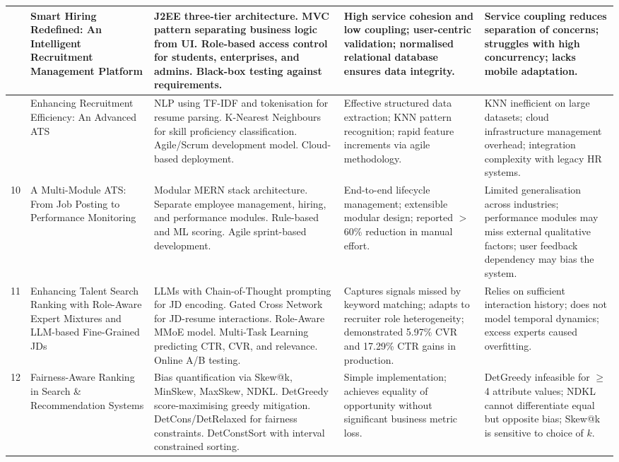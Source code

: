 \documentclass[12pt,a4paper]{report}
\begin{document}
\begin{longtable}{|>{\centering\arraybackslash}p{0.6cm}|p{3.1cm}|p{3.6cm}|p{3.2cm}|p{3.2cm}|}
8 & Smart Hiring Redefined: An Intelligent Recruitment Management Platform \cite{ref8} &
J2EE three-tier architecture. MVC pattern separating business logic from UI. Role-based access control for students, enterprises, and admins. Black-box testing against requirements. &
High service cohesion and low coupling; user-centric validation; normalised relational database ensures data integrity. &
Service coupling reduces separation of concerns; struggles with high concurrency; lacks mobile adaptation. \\
\hline

9 & Enhancing Recruitment Efficiency: An Advanced ATS \cite{ref9} &
NLP using TF-IDF and tokenisation for resume parsing. K-Nearest Neighbours for skill proficiency classification. Agile/Scrum development model. Cloud-based deployment. &
Effective structured data extraction; KNN pattern recognition; rapid feature increments via agile methodology. &
KNN inefficient on large datasets; cloud infrastructure management overhead; integration complexity with legacy HR systems. \\
\hline

10 & A Multi-Module ATS: From Job Posting to Performance Monitoring \cite{ref10} &
Modular MERN stack architecture. Separate employee management, hiring, and performance modules. Rule-based and ML scoring. Agile sprint-based development. &
End-to-end lifecycle management; extensible modular design; reported $>$60\% reduction in manual effort. &
Limited generalisation across industries; performance modules may miss external qualitative factors; user feedback dependency may bias the system. \\
\hline

11 & Enhancing Talent Search Ranking with Role-Aware Expert Mixtures and LLM-based Fine-Grained JDs \cite{ref11} &
LLMs with Chain-of-Thought prompting for JD encoding. Gated Cross Network for JD-resume interactions. Role-Aware MMoE model. Multi-Task Learning predicting CTR, CVR, and relevance. Online A/B testing. &
Captures signals missed by keyword matching; adapts to recruiter role heterogeneity; demonstrated 5.97\% CVR and 17.29\% CTR gains in production. &
Relies on sufficient interaction history; does not model temporal dynamics; excess experts caused overfitting. \\
\hline

12 & Fairness-Aware Ranking in Search \& Recommendation Systems \cite{ref12} &
Bias quantification via Skew@k, MinSkew, MaxSkew, NDKL. DetGreedy score-maximising greedy mitigation. DetCons/DetRelaxed for fairness constraints. DetConstSort with interval constrained sorting. &
Simple implementation; achieves equality of opportunity without significant business metric loss. &
DetGreedy infeasible for $\geq$4 attribute values; NDKL cannot differentiate equal but opposite bias; Skew@k is sensitive to choice of $k$. \\
\hline


\end{longtable}
\end{document}
